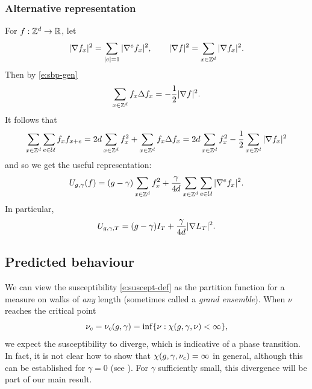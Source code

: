 \subsubsection{Alternative representation}

For $f : { {{\mathbb Z}}^d } \rightarrow {\mathbb R}$, let 
\begin{equation}
|\nabla f_x|^2 = \sum_{|e|=1} |\nabla^e f_x|^2,
	\qquad
|\nabla f|^2 = \sum_{x\in{ {{\mathbb Z}}^d }} |\nabla f_x|^2.
\end{equation}
Then by \eqref{e:sbp-gen}
\begin{equation}
\label{e:sbp}
\sum_{x\in{ {{\mathbb Z}}^d }} f_x \Delta f_x
	=
-\frac{1}{2} |\nabla f|^2.
\end{equation}
It follows that
\begin{equation}
\sum_{x\in{ {{\mathbb Z}}^d }} \sum_{e\in\mathcal{U}} f_x f_{x+e}
=
2 d \sum_{x\in{ {{\mathbb Z}}^d }} f_x^2
+ \sum_{x\in{ {{\mathbb Z}}^d }} f_x \Delta f_x
=
2 d \sum_{x\in{ {{\mathbb Z}}^d }} f_x^2
- \frac{1}{2} \sum_{x\in{ {{\mathbb Z}}^d }} |\nabla f_x|^2
\end{equation}
and so we get the useful representation:
\begin{equation}
\label{e:Udef-pos}
U_{g,\gamma}(f)
= (g - \gamma) \sum_{x\in{ {{\mathbb Z}}^d }} f_x^2
+ \frac{\gamma}{4d} \sum_{x\in{ {{\mathbb Z}}^d }} \sum_{e\in\mathcal{U}} |\nabla^e f_x|^2.
\end{equation}
In particular,
\begin{equation}
  \label{e:V2}
  U_{g,\gamma,T} =
  (g - \gamma) I_T
  + \frac{\gamma}{4d}
  |\nabla L_T|^2
  .
\end{equation}


\subsection{Predicted behaviour}

We can view the susceptibility \eqref{e:suscept-def} as the partition function
for a measure on walks of \emph{any} length (sometimes called a \emph{grand
ensemble}). When $\nu$ reaches the critical point
\begin{equation}
\nu_c = \nu_c(g, \gamma) = \inf\{ \nu : \chi(g,\gamma,\nu) < \infty \},
\end{equation}
we expect the susceptibility to diverge, which is indicative of a phase transition.
In fact, it is not clear how to show that $\chi(g,\gamma,\nu_c) = \infty$ in
general, although this can be established for $\gamma = 0$
(see \cite[Lemma~\ref{log-lem:csub}]{BBS-saw4-log}). For $\gamma$
sufficiently small, this divergence will be part of our main result.

